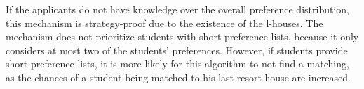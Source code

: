 If the applicants do not have knowledge over the overall preference distribution, this mechanism is strategy-proof due to the existence of the l-houses. The mechanism does not prioritize students with short preference lists, because it only considers at most two of the students' preferences. However, if students provide short preference lists, it is more likely for this algorithm to not find a matching, as the chances of a student being matched to his last-resort house are increased.